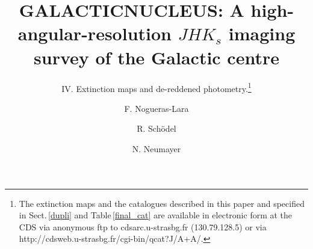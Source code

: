 \documentclass{aa}
\begin{document}
 
  

   \title{GALACTICNUCLEUS: A high-angular-resolution $JHK_s$ imaging survey of the Galactic centre}

   \subtitle{IV. Extinction maps and de-reddened photometry.\thanks{The extinction maps and the catalogues described in this paper and specified in Sect.\,\ref{dupli} and Table\,\ref{final_cat} are available in electronic form at the CDS via anonymous ftp to cdsarc.u-strasbg.fr (130.79.128.5) or via http://cdsweb.u-strasbg.fr/cgi-bin/qcat?J/A+A/.}}
   
   
  \author{F. Nogueras-Lara
          \and      
          R. Sch\"odel 
          \and
          N. Neumayer 
          }

   \date{}

 
\end{document}
